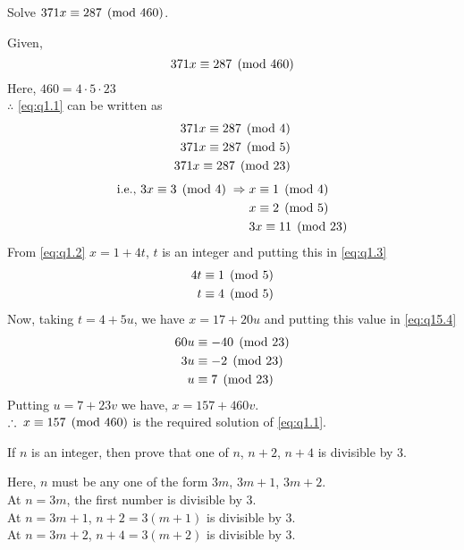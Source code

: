 \documentclass[12pt,class=book,crop=false]{standalone}
\begin{document}
\begin{qn}[100E]
    Solve $ 371x\equiv 287 \pmod{460} $.
\end{qn}
\begin{soln}
    Given,
    \begin{equation}
        371x\equiv 287 \pmod{460} \label{eq:q1.1}
    \end{equation}
    Here, $ 460=4\cdot5\cdot23 $\\
    $ \therefore $ \eqref{eq:q1.1} can be written as 
    \begin{align*}
        371x\equiv 287 \pmod{4}\\
        371x\equiv 287 \pmod{5}\\
        371x\equiv 287 \pmod{23}
    \end{align*}
    \begin{align}
        \text{i.e., } 3x\equiv 3 \pmod{4}\;\Rightarrow\; & x\equiv 1 \pmod{4}\label{eq:q1.2}\\
        & x\equiv 2 \pmod{5}\label{eq:q1.3}\\
        & 3x\equiv 11 \pmod{23}\label{eq:q1.4}
    \end{align}
    From \eqref{eq:q1.2} $ x=1+4t $, $ t $ is an integer and putting this in \eqref{eq:q1.3}
    \begin{align*}
        4t&\equiv 1 \pmod{5}\\
        t&\equiv 4 \pmod{5}
    \end{align*}
    Now, taking $ t=4+5u $, we have $ x=17+20u $ and putting this value in \eqref{eq:q15.4}
    \begin{align*}
        60u&\equiv -40 \pmod{23}\\
        3u&\equiv -2 \pmod{23}\\
        u&\equiv 7 \pmod{23}
    \end{align*}
    Putting $ u=7+23v $ we have, $ x=157+460v $.\\
    $ \therefore\; x\equiv 157 \pmod{460} $ is the required solution of \eqref{eq:q1.1}.
\end{soln}
\begin{qn}
    If $ n $ is an integer, then prove that one of $ n $, $ n+2 $, $ n+4 $ is divisible by 3.
\end{qn}
\begin{soln}\hfill
    
    
    Here, $ n $ must be any one of the form $ 3m $, $ 3m+1 $, $ 3m+2 $.\\
    At $ n=3m $, the first number is divisible by 3.\\
    At $ n=3m+1 $, $ n+2=3(m+1) $ is divisible by 3.\\
    At $ n=3m+2 $, $ n+4=3(m+2) $ is divisible by 3.
\end{soln}
\end{document}
